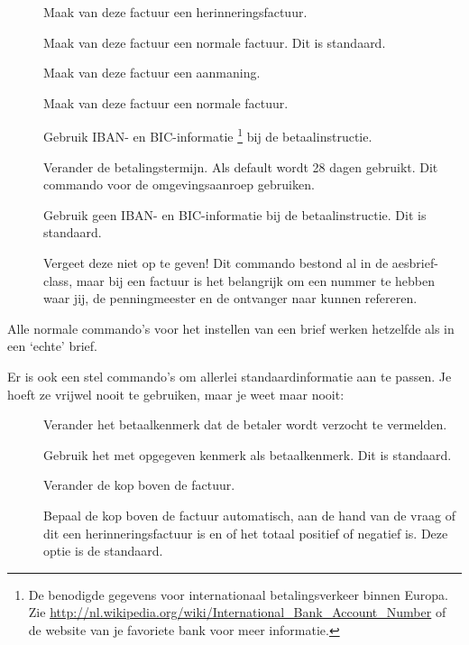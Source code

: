 \documentclass{article}
\newcommand\meta[1]{\placeholder[#1]}
\newcommand\marg[1]{\cmdarg{\meta{#1}}}
\begin{document}
\begin{description}
\item[]        Maak van deze factuur een herinneringsfactuur.
\item[]    Maak van deze factuur een normale factuur. Dit is standaard.
\item[]			Maak van deze factuur een aanmaning.
\item[]		Maak van deze factuur een normale factuur.
\item[] Gebruik IBAN- en BIC-informatie%
  \footnote{De benodigde gegevens voor internationaal betalingsverkeer binnen Europa.
            Zie \url{http://nl.wikipedia.org/wiki/International_Bank_Account_Number}
            of de website van je favoriete bank voor meer informatie.}
  bij de betaalinstructie.
\item[]	Verander de betalingstermijn. Als default wordt 28 dagen gebruikt. Dit commando voor de omgevingsaanroep gebruiken.  
\item[] Gebruik geen IBAN- en BIC-informatie bij de betaalinstructie. Dit is standaard.
\item[\marg{kenmerk}]
  Vergeet deze niet op te geven! Dit commando bestond al in de
  \textsf{aesbrief}-class, maar bij een factuur is het belangrijk om een nummer
  te hebben waar jij, de penningmeester en de ontvanger naar kunnen refereren.
\end{description}

Alle normale commando's voor het instellen van een brief werken hetzelfde als
in een `echte' brief.

Er is ook een stel commando's om allerlei standaardinformatie aan te passen.
Je hoeft ze vrijwel nooit te gebruiken, maar je weet maar nooit:

\begin{description}
\item[\marg{ovv}]   Verander het betaalkenmerk dat de betaler wordt verzocht te vermelden.
\item[]         Gebruik het met  opgegeven kenmerk als betaalkenmerk. Dit is standaard.
\item[\marg{titel}]
  Verander de kop boven de factuur.
\item[]
  Bepaal de kop boven de factuur automatisch, aan de hand van de vraag of dit
  een herinneringsfactuur is en of het totaal positief of negatief is.
  Deze optie is de standaard.
\end{description}
\end{document}
